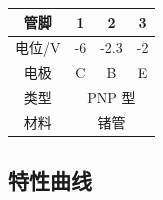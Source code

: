 \documentclass[12pt]{article}
\begin{document}
\begin{table}[!h]
    \centering
    \begin{tabular}{c|c|c|c}
    \hline 管脚 & 1 & 2 & 3 \\
    \hline 电位/V & -6 & -2.3 & -2 \\
    \hline 电极 & C & B & E \\
    \hline 类型 & \multicolumn{3}{|c}{ PNP 型 } \\
    \hline 材料 & \multicolumn{3}{|c}{ 锗管 } \\
    \hline
    \end{tabular}
\end{table}

\subsection{特性曲线}
\end{document}
